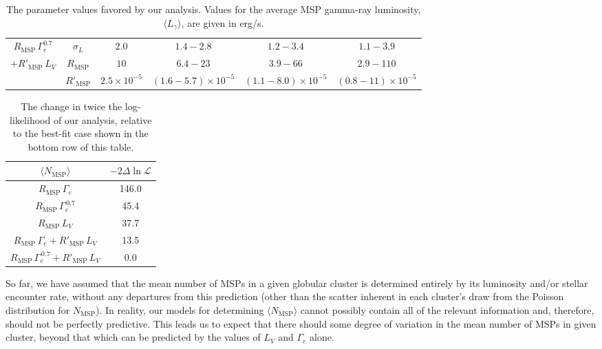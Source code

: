 \begin{table}[t]
{\begin{tabular}{|c|c|cccc|}
     $R_\textrm{MSP} \, \Gamma_e^{0.7}$ & $\sigma_L$ & $2.0$& $1.4 - 2.8$& $1.2 - 3.4$& $1.1 - 3.9$ \\
    $+R'_\textrm{MSP}\,L_V$& $R_\textrm{MSP}$ & $10$& $6.4-23$& $3.9 - 66$& $2.9 - 110$ \\
    & $R'_\textrm{MSP}$ & $2.5\times 10^{-5}$& $(1.6-5.7)\times 10^{-5}$& $(1.1-8.0)\times 10^{-5}$& $(0.8-11)\times 10^{-5}$ \\
    \hline   
\end{tabular}
}
\caption{The parameter values favored by our analysis. Values for the average MSP gamma-ray luminosity, $\langle L_{\gamma} \rangle$, are given in erg/s.}
\label{tab:param_constraints}
\end{table}

\begin{table}[t]
\centering
\normalsize
\vspace{12pt}
{\renewcommand{\arraystretch}{1.2}
\begin{tabular}{|c|c|}
    \hline $\langle N_\textrm{MSP}\rangle$ & $-2\Delta \ln \mathcal{L}$\\
    \hline\hline
       $R_\textrm{MSP} \, \Gamma_e$ & 146.0 \\
    \hline
       $R_\textrm{MSP} \, \Gamma_e^{\,0.7}$ & 45.4 \\
    \hline
       $R_\textrm{MSP} \, L_V$ & 37.7 \\
    \hline    
       $R_\textrm{MSP} \, \Gamma_e +R'_\textrm{MSP}\,L_V$ & 13.5 \\
    \hline  
       $R_\textrm{MSP} \, \Gamma_e^{\,0.7} +R'_\textrm{MSP}\,L_V$ & 0.0 \\
    \hline      
\end{tabular}
}
\caption{The change in twice the log-likelihood of our analysis, relative to the best-fit case shown in the bottom row of this table.}
\label{tab:models_compare}
\end{table}

So far, we have assumed that the mean number of MSPs in a given globular cluster is determined entirely by its luminosity and/or stellar encounter rate, without any departures from this prediction (other than the scatter inherent in each cluster's draw from the Poisson distribution for $N_\textrm{MSP}$). In reality, our models for determining $\langle N_\textrm{MSP} \rangle$ cannot possibly contain all of the relevant information and, therefore, should not be perfectly predictive. This leads us to expect that there should some degree of variation in the mean number of MSPs in given cluster, beyond that which can be predicted by the values of $L_V$ and $\Gamma_e$ alone. 

